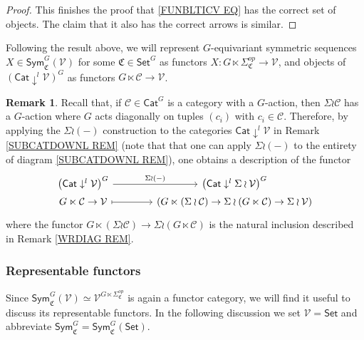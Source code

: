\documentclass[a4paper,10pt
,draft
]{article}%
\numberwithin{equation}{section}
\numberwithin{figure}{section}
\theoremstyle{definition} %
\newtheorem{remark}[equation]{Remark}%
\newcommand{\V}{\ensuremath{\mathcal V}}
\newcommand{\1}{\ensuremath{\mathbbm 1}}%
\begin{document}
\begin{proof}
This finishes the proof that \eqref{FUNBLTICV EQ} has the correct set of objects. The claim that it also has the correct arrows is similar.
\end{proof}


Following the result above, 
we will represent $G$-equivariant symmetric sequences
$X \in \mathsf{Sym}^G_{\mathfrak{C}}(\mathcal{V})$
for some $\mathfrak{C} \in \mathsf{Set}^G$
as functors
$X \colon G \ltimes \Sigma_{\mathfrak{C}}^{op} \to \mathcal{V}$,
and objects of
$\left( \mathsf{Cat} \downarrow^{l} \mathcal{V} \right)^G$
as functors $G \ltimes \mathcal{C} \to \V$.


\begin{remark}\label{RHOPURP REM}
Recall that, if $\mathcal{C}\in \mathsf{Cat}^G$ is a category with a $G$-action,
then 
$\Sigma \wr \mathcal{C}$
has a $G$-action where $G$ acts diagonally on tuples $(c_i)$ with $c_i \in \mathcal{C}$.
Therefore, by applying the 
$\Sigma \wr (-)$
construction to the categories
$\mathsf{Cat} \downarrow^l \V$
in Remark \ref{SUBCATDOWNL REM}
(note that that one can apply $\Sigma \wr (-)$
to the entirety of diagram \eqref{SUBCATDOWNL REM}),
one obtains a description of the functor
\begin{equation}\label{RHOPURP EQ}
\begin{tikzcd}[column sep =40,row sep =0]
	\left( \mathsf{Cat} \downarrow^{l} \mathcal{V} \right)^G
	\ar{r}{\Sigma \wr (-) } &
	\left( \mathsf{Cat} \downarrow^{l} \Sigma \wr \mathcal{V} \right)^G
\\
	G \ltimes \mathcal{C} \to \mathcal{V} \ar[mapsto]{r} &
	\left(G \ltimes (\Sigma \wr \mathcal{C}) \to 
	\Sigma \wr (G \ltimes  \mathcal{C}) \to \Sigma \wr \mathcal{V}\right)
\end{tikzcd}
\end{equation}
where the functor
$G \ltimes (\Sigma \wr \mathcal{C}) \to 
\Sigma \wr (G \ltimes  \mathcal{C})$
is the natural inclusion described in Remark \ref{WRDIAG REM}.
\end{remark}


\subsubsection*{Representable functors}\label{REPFUN_SEC}

Since  
$\mathsf{Sym}^G_{\mathfrak{C}}(\mathcal{V}) \simeq 
\V^{G \ltimes \Sigma^{op}_{\mathfrak{C}}}$ is again a functor category, 
we will find it useful to discuss its representable functors.
In the following discussion 
we set $\V = \mathsf{Set}$ and abbreviate
$\mathsf{Sym}^G_{\mathfrak{C}} = \mathsf{Sym}^G_{\mathfrak{C}}(\mathsf{Set})$.
\end{document}
